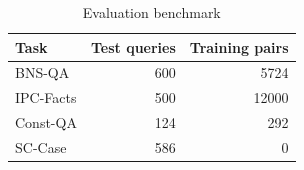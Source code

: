 \begin{table}
\caption{Evaluation benchmark}
\label{tab:gold}
\begin{tabular}{lrr}
\toprule
Task & Test queries & Training pairs \\
\midrule
BNS-QA & 600 & 5724 \\
IPC-Facts & 500 & 12000 \\
Const-QA & 124 & 292 \\
SC-Case & 586 & 0 \\
\bottomrule
\end{tabular}
\end{table}

